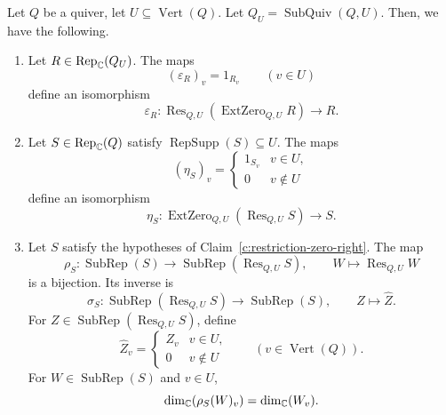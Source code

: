 \begin{lemma}\label{lem:rep-restriction-zero}
Let $Q$ be a quiver, let $U\subseteq\operatorname{Vert}(Q)$. Let $Q_U=\operatorname{SubQuiv}(Q,U)$.
Then, we have the following.

\begin{enumerate}
\item\label{c:restriction-zero-left} Let $R\in\operatorname{Rep}_{\mathbb C}(Q_U)$.
The maps
\[
 (\varepsilon_R)_v=1_{R_v}\qquad(v\in U)
\]
define an isomorphism
\[
 \varepsilon_R:\operatorname{Res}_{Q,U}(\operatorname{ExtZero}_{Q,U}R)\longrightarrow R.
\]
\item\label{c:restriction-zero-right} Let $S\in\operatorname{Rep}_{\mathbb C}(Q)$ satisfy $\operatorname{RepSupp}(S)\subseteq U$.
The maps
\[
 (\eta_S)_v=
 \begin{cases}1_{S_v}&v\in U,\\0&v\notin U\end{cases}
\]
define an isomorphism
\[
 \eta_S:\operatorname{ExtZero}_{Q,U}(\operatorname{Res}_{Q,U}S)\longrightarrow S.
\]
\item\label{c:restriction-zero-subrep} Let $S$ satisfy the hypotheses of Claim~\ref{c:restriction-zero-right}.
The map
\[
 \rho_S:\operatorname{SubRep}(S)\longrightarrow
 \operatorname{SubRep}(\operatorname{Res}_{Q,U}S),\qquad
 W\longmapsto\operatorname{Res}_{Q,U}W
\]
is a bijection. Its inverse is
\[
 \sigma_S:\operatorname{SubRep}(\operatorname{Res}_{Q,U}S)\longrightarrow
 \operatorname{SubRep}(S),\qquad Z\longmapsto\widehat Z.
\]
For $Z\in\operatorname{SubRep}(\operatorname{Res}_{Q,U}S)$, define
\[
 \widehat Z_v=
 \begin{cases}Z_v&v\in U,\\0&v\notin U\end{cases}
 \qquad(v\in\operatorname{Vert}(Q)).
\]
For $W\in\operatorname{SubRep}(S)$ and $v\in U$,
\[
 \dim_{\mathbb C}(\rho_S(W)_v)=\dim_{\mathbb C}(W_v).
\]
\end{enumerate}
\end{lemma}
